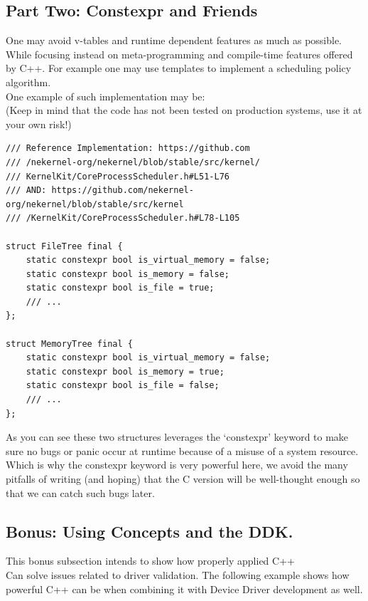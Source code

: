 \documentclass{article}
\begin{document}
\subsection{Part Two: Constexpr and Friends}
{
One may avoid v-tables and runtime dependent features as much as possible. \\
While focusing instead on meta-programming and compile-time features offered by C++. For example one may use templates to implement a scheduling policy algorithm. \\
One example of such implementation may be: \\

(Keep in mind that the code has not been tested on production systems, use it at your own risk!)

\begin{lstlisting}
/// Reference Implementation: https://github.com
/// /nekernel-org/nekernel/blob/stable/src/kernel/
/// KernelKit/CoreProcessScheduler.h#L51-L76
/// AND: https://github.com/nekernel-org/nekernel/blob/stable/src/kernel
/// /KernelKit/CoreProcessScheduler.h#L78-L105

struct FileTree final {
    static constexpr bool is_virtual_memory = false;
    static constexpr bool is_memory = false;
    static constexpr bool is_file = true;
    /// ...
};

struct MemoryTree final {
    static constexpr bool is_virtual_memory = false;
    static constexpr bool is_memory = true;
    static constexpr bool is_file = false;
    /// ...
};
\end{lstlisting}

As you can see these two structures
leverages the `constexpr' keyword to make sure
no bugs or panic occur at runtime because of a misuse of a system resource. \\

Which is why the constexpr keyword is very powerful here, we avoid the many pitfalls of writing (and hoping) that the C version will be well-thought enough so that we can catch such bugs later.

\subsection{Bonus: Using Concepts and the DDK.}
{
This bonus subsection intends to show how properly applied C++\\
Can solve issues related to driver validation.
The following example shows how powerful C++ can be when combining it with Device Driver development as well.

}}
\end{document}
